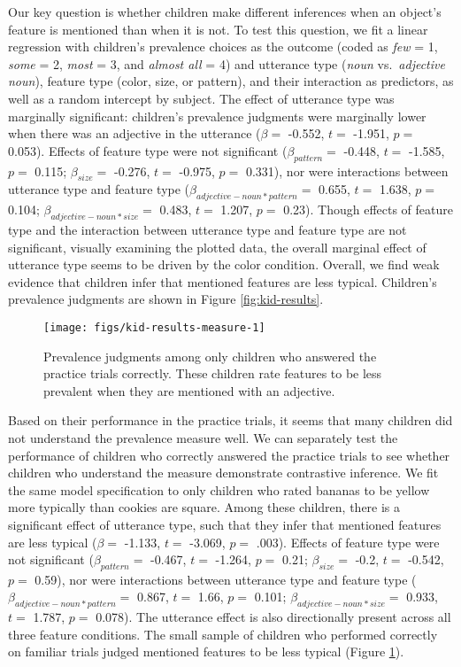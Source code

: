 \documentclass{ucetd}
\begin{document}
Our key question is whether children make different inferences when an
object's feature is mentioned than when it is not. To test this
question, we fit a linear regression with children's prevalence choices
as the outcome (coded as \emph{few} = 1, \emph{some} = 2, \emph{most} =
3, and \emph{almost all} = 4) and utterance type (\emph{noun}
vs.~\emph{adjective noun}), feature type (color, size, or pattern), and
their interaction as predictors, as well as a random intercept by
subject. The effect of utterance type was marginally significant:
children's prevalence judgments were marginally lower when there was an
adjective in the utterance (\(\beta =\) -0.552, \(t =\) -1.951, \(p =\)
0.053). Effects of feature type were not significant
(\(\beta_{pattern} =\) -0.448, \(t =\) -1.585, \(p =\) 0.115;
\(\beta_{size} =\) -0.276, \(t =\) -0.975, \(p =\) 0.331), nor were
interactions between utterance type and feature type
(\(\beta_{adjective-noun*pattern} =\) 0.655, \(t =\) 1.638, \(p =\)
0.104; \(\beta_{adjective-noun*size} =\) 0.483, \(t =\) 1.207, \(p =\)
0.23). Though effects of feature type and the interaction between
utterance type and feature type are not significant, visually examining
the plotted data, the overall marginal effect of utterance type seems to
be driven by the color condition. Overall, we find weak evidence that
children infer that mentioned features are less typical. Children's
prevalence judgments are shown in Figure \ref{fig:kid-results}.

\begin{figure}[!tb]

{\centering \texttt{[image: figs/kid-results-measure-1]} 

}

\caption{Prevalence judgments among only children who answered the practice trials correctly. These children rate features to be less prevalent when they are mentioned with an adjective.}\label{fig:kid-results-measure}
\end{figure}

Based on their performance in the practice trials, it seems that many
children did not understand the prevalence measure well. We can
separately test the performance of children who correctly answered the
practice trials to see whether children who understand the measure
demonstrate contrastive inference. We fit the same model specification
to only children who rated bananas to be yellow more typically than
cookies are square. Among these children, there is a significant effect
of utterance type, such that they infer that mentioned features are less
typical (\(\beta =\) -1.133, \(t =\) -3.069, \(p =\) .003). Effects of
feature type were not significant (\(\beta_{pattern} =\) -0.467, \(t =\)
-1.264, \(p =\) 0.21; \(\beta_{size} =\) -0.2, \(t =\) -0.542, \(p =\)
0.59), nor were interactions between utterance type and feature type
(\(\beta_{adjective-noun*pattern} =\) 0.867, \(t =\) 1.66, \(p =\)
0.101; \(\beta_{adjective-noun*size} =\) 0.933, \(t =\) 1.787, \(p =\)
0.078). The utterance effect is also directionally present across all
three feature conditions. The small sample of children who performed
correctly on familiar trials judged mentioned features to be less
typical (Figure \ref{fig:kid-results-measure}).
\end{document}
